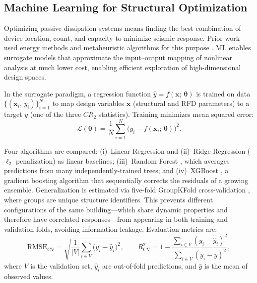 \documentclass[preprint,12pt,authoryear]{elsarticle}
\newcommand{\RMSE}{\mathrm{RMSE_{CV}}}       %
\newcommand{\Rsq}{R^{2}_{\mathrm{CV}}}
\begin{document}
\subsection{Machine Learning for Structural Optimization}
\label{sec:theory:ml}

Optimizing passive dissipation systems means finding the best combination of device
location, count, and capacity to minimize seismic response. Prior work used energy
methods and metaheuristic algorithms for this purpose
\citep{moreschi_design_2003, moghaddam_optimal_2022, ontiveros-perez_reliability-based_2019}.
ML enables surrogate models that approximate the input--output mapping of nonlinear
analysis at much lower cost, enabling efficient exploration of high-dimensional design
spaces.

In the surrogate paradigm, a regression function $\hat{y} = f(\bm{x};\,\bm{\theta})$
is trained on data $\{(\bm{x}_i,\,y_i)\}_{i=1}^{N}$ to map design variables $\bm{x}$
(structural and RFD parameters) to a target $y$ (one of the three $CR_2$ statistics).
Training minimizes mean squared error:
\begin{equation}
    \mathcal{L}(\bm{\theta}) = \frac{1}{N}\sum_{i=1}^{N}
    \bigl(y_i - f(\bm{x}_i;\,\bm{\theta})\bigr)^2.
    \label{eq:mse}
\end{equation}

Four algorithms are compared: (i)~Linear Regression and (ii)~Ridge Regression
($\ell_2$ penalization) as linear baselines; (iii)~Random Forest \citep{Breiman2001},
which averages predictions from many independently-trained trees; and (iv)~XGBoost
\citep{Chen2016}, a gradient boosting algorithm that sequentially corrects the residuals
of a growing ensemble. Generalization is estimated via five-fold GroupKFold
cross-validation \citep{Kazemi2022}, where groups are unique structure identifiers. This
prevents different configurations of the same building---which share dynamic properties
and therefore have correlated responses---from appearing in both training and validation
folds, avoiding information leakage. Evaluation metrics are:
\begin{equation}
    \RMSE = \sqrt{\frac{1}{|V|}\sum_{i \in V}\bigl(y_i - \hat{y}_i\bigr)^2},
    \qquad
    \Rsq  = 1 - \frac{\sum_{i \in V}(y_i - \hat{y}_i)^2}
                      {\sum_{i \in V}(y_i - \bar{y})^2},
    \label{eq:metrics}
\end{equation}
where $V$ is the validation set, $\hat{y}_i$ are out-of-fold predictions, and $\bar{y}$
is the mean of observed values.
\end{document}
